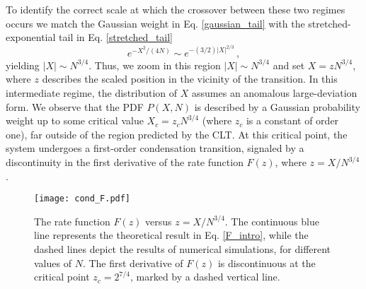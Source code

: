 \documentclass[aps,pre,twocolumn,superscriptaddress,showpacs]{revtex4-1}
\begin{document}
To identify the correct scale at which the crossover between these two regimes occurs we match the Gaussian weight in Eq. \eqref{gaussian_tail} with the stretched-exponential tail in Eq. \eqref{stretched_tail}
\begin{equation}
e^{-X^2/(4N)}\sim e^{-(3/2)|X|^{2/3}}\,,
\end{equation}
yielding $|X|\sim N^{3/4}$. Thus, we zoom in this region $|X|\sim N^{3/4}$ and set $X=z N^{3/4}$, where $z$ describes the scaled position in the vicinity of the transition. In this intermediate regime, the distribution of $X$ assumes an anomalous large-deviation form. We observe that the PDF $P(X,N)$ is described by a Gaussian probability weight up to some critical value $X_c=z_c  N^{3/4} $ (where $z_c$ is a constant of order one), far outside of the region predicted by the CLT. At this critical point, the system undergoes a first-order condensation transition, signaled by a discontinuity in the first derivative of the rate function $F(z)$, where $z=X/N^{3/4}$. 


\begin{figure}
\texttt{[image: cond\_F.pdf]}
\caption{The rate function $F(z)$ versus $z=X/N^{3/4}$. The continuous blue line represents the theoretical result in Eq. \eqref{F_intro}, while the dashed lines depict the results of numerical simulations, for different values of $N$. The first derivative of $F(z)$ is discontinuous at the critical point $z_c=2^{7/4}$, marked by a dashed vertical line.}
\label{fig:F}
\end{figure}
\end{document}
